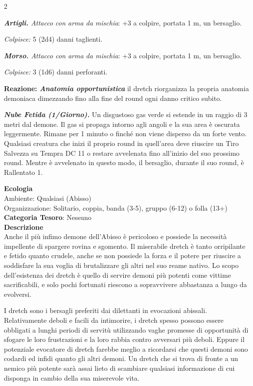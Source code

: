 \begin{multicols}{2}
{\emph{\textbf{Artigli.} Attacco con arma da mischia}: +3 a colpire, portata 1 m, un bersaglio.

\emph{Colpisce:} 5 (2d4) danni taglienti.

\emph{\textbf{Morso.} Attacco con arma da mischia}: +3 a colpire, portata 1 m, un bersaglio.

\emph{Colpisce:} 3 (1d6) danni perforanti.

\textbf{Reazione: \emph{Anatomia opportunistica}} il dretch riorganizza la propria anatomia demoniaca dimezzando fino alla fine del round ogni danno critico subito.

\emph{\textbf{Nube Fetida (1/Giorno).}} Un disgustoso gas verde si estende in un raggio di 3 metri dal demone. Il gas si propaga intorno agli angoli e la sua area è oscurata leggermente. Rimane per 1 minuto o finché non viene disperso da un forte vento. Qualsiasi creatura che inizi il proprio round in quell'area deve riuscire un Tiro Salvezza su Tempra DC 11 o restare avvelenata fino all'inizio del suo prossimo round. Mentre è avvelenato in questo modo, il bersaglio, durante il suo round, è Rallentato 1.

\textbf{Ecologia}\\
Ambiente: Qualsiasi (Abisso)\\
Organizzazione: Solitario, coppia, banda (3-5), gruppo (6-12) o folla (13+)\\
\textbf{Categoria Tesoro}: Nessuno\\
\textbf{Descrizione}\\
Anche il più infimo demone dell'Abisso è pericoloso e possiede la necessità impellente di spargere rovina e sgomento. Il miserabile dretch è tanto orripilante e fetido quanto crudele, anche se non possiede la forza e il potere per riuscire a soddisfare la sua voglia di brutalizzare gli altri nel suo reame nativo. Lo scopo dell'esistenza dei dretch è quello di servire demoni più potenti come vittime sacrificabili, e solo pochi fortunati riescono a sopravvivere abbastanza a lungo da evolversi.

I dretch sono i bersagli preferiti dai dilettanti in evocazioni abissali. Relativamente deboli e facili da intimorire, i dretch spesso possono essere obbligati a lunghi periodi di servitù utilizzando vaghe promesse di opportunità di sfogare le loro frustrazioni e la loro rabbia contro avversari più deboli. Eppure il potenziale evocatore di dretch farebbe meglio a ricordarsi che questi demoni sono codardi ed infidi quanto gli altri demoni. Un dretch che si trova di fronte a un nemico più potente sarà assai lieto di scambiare qualsiasi informazione di cui disponga in cambio della sua miserevole vita.

}
\end{multicols}
